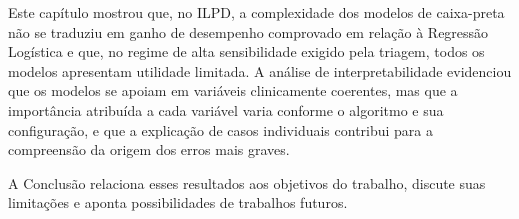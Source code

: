 Este capítulo mostrou que, no ILPD, a complexidade dos modelos de caixa-preta não se traduziu em ganho de desempenho comprovado em relação à Regressão Logística e que, no regime de alta sensibilidade exigido pela triagem, todos os modelos apresentam utilidade limitada. A análise de interpretabilidade evidenciou que os modelos se apoiam em variáveis clinicamente coerentes, mas que a importância atribuída a cada variável varia conforme o algoritmo e sua configuração, e que a explicação de casos individuais contribui para a compreensão da origem dos erros mais graves.

A Conclusão relaciona esses resultados aos objetivos do trabalho, discute suas limitações e aponta possibilidades de trabalhos futuros.
